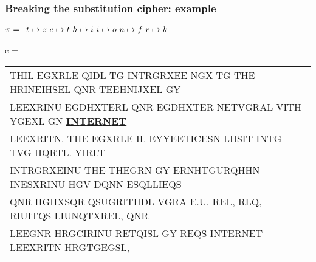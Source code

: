 \documentclass[aspectratio=169, lualatex, handout, 10pt,dvipsnames,svgnames]{beamer} %
\def\enbleu#1{\textcolor{bleu}{#1}}
\def\enrouge#1{\textcolor{rouge}{#1}}
\begin{document}
\begin{frame}
  \frametitle{Breaking the substitution cipher: example}
  
    \enrouge{
    \tiny{$\pi=
      \begin{array}[t]{l}
      t\mapsto z\ e\mapsto t\ h\mapsto i\ i\mapsto o\ n\mapsto f\ r\mapsto k
      \end{array}
      $}}
  \vspace{0.25cm}

  \color{vert}
  \tiny{c =
    \begin{tabular}[t]{l}
      \enbleu{T}\enbleu{H}\enbleu{I}L EGX\enbleu{R}L\enbleu{E} Q\enbleu{I}DL \enbleu{T}G \enbleu{I}\enbleu{N}\enbleu{T}\enbleu{R}GRXE\enbleu{E} NGX \enbleu{T}G \enbleu{T}\enbleu{H}\enbleu{E} H\enbleu{R}\enbleu{I}\enbleu{N}E\enbleu{I}HS\enbleu{E}L Q\enbleu{N}R \enbleu{T}\enbleu{E}E\enbleu{H}\enbleu{N}\enbleu{I}JX\enbleu{E}L GY \\
      L\enbleu{E}EX\enbleu{R}\enbleu{I}\enbleu{N}U EGDHX\enbleu{T}\enbleu{E}\enbleu{R}L Q\enbleu{N}R EGDHX\enbleu{T}\enbleu{E}\enbleu{R} \enbleu{N}\enbleu{E}\enbleu{T}VG\enbleu{R}AL V\enbleu{I}\enbleu{T}\enbleu{H} YGEXL G\enbleu{N} \underline{\bf \enbleu{I}\enbleu{N}\enbleu{T}\enbleu{E}\enbleu{R}\enbleu{N}\enbleu{E}\enbleu{T}} \\
      L\enbleu{E}EX\enbleu{R}\enbleu{I}\enbleu{T}N. \enbleu{T}\enbleu{H}\enbleu{E} EGX\enbleu{R}L\enbleu{E} \enbleu{I}L \enbleu{E}YY\enbleu{E}E\enbleu{T}\enbleu{I}C\enbleu{E}SN LHS\enbleu{I}\enbleu{T} \enbleu{I}\enbleu{N}\enbleu{T}G \enbleu{T}VG HQ\enbleu{R}\enbleu{T}L. Y\enbleu{I}\enbleu{R}L\enbleu{T} \\
      \enbleu{I}\enbleu{N}\enbleu{T}\enbleu{R}GRXE\enbleu{I}\enbleu{N}U \enbleu{T}\enbleu{H}\enbleu{E} \enbleu{T}\enbleu{H}\enbleu{E}G\enbleu{R}N GY E\enbleu{R}NH\enbleu{T}GU\enbleu{R}QH\enbleu{H}N \enbleu{I}\enbleu{N}ESXR\enbleu{I}\enbleu{N}U \enbleu{H}GV DQ\enbleu{N}N ESQLL\enbleu{I}EQS \\
      Q\enbleu{N}R HGHXSQ\enbleu{R} QSUG\enbleu{R}\enbleu{I}\enbleu{T}\enbleu{H}DL VG\enbleu{R}A \enbleu{E}.U. R\enbleu{E}L, \enbleu{R}LQ, R\enbleu{I}U\enbleu{I}\enbleu{T}QS L\enbleu{I}U\enbleu{N}Q\enbleu{T}X\enbleu{R}\enbleu{E}L, Q\enbleu{N}R \\
      L\enbleu{E}EG\enbleu{N}R H\enbleu{R}GC\enbleu{I}R\enbleu{I}\enbleu{N}U R\enbleu{E}\enbleu{T}Q\enbleu{I}SL GY \enbleu{R}\enbleu{E}QS \enbleu{I}\enbleu{N}\enbleu{T}\enbleu{E}\enbleu{R}\enbleu{N}\enbleu{E}\enbleu{T} L\enbleu{E}EX\enbleu{R}\enbleu{I}\enbleu{T}N H\enbleu{R}G\enbleu{T}GEGSL, \\

\end{tabular}}
\end{frame}
\end{document}

